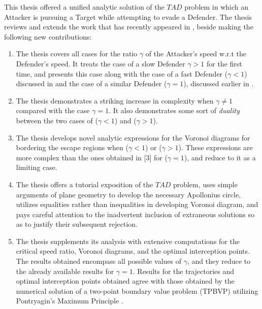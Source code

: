 This thesis offered a unified analytic solution of the $TAD$ problem in which an Attacker is pursuing a Target while attempting to evade a Defender. The thesis reviews and extends the work that has recently appeared in \cite{pachter2014active,garcia2015active,garcia2015escape}, beside making the following new contributions:

\begin{enumerate}
\item The thesis covers all cases for the ratio $\gamma$ of the Attacker's speed w.r.t the Defender's speed. It treats the case of a slow Defender $\gamma>1$ for the first time, and presents this case along with the case of a fast Defender ($\gamma<1$) discussed in \cite{garcia2015active} and the case of a similar Defender ($\gamma=1$), discussed earlier in \cite{pachter2014active,garcia2015escape}.
\item The thesis demonstrates a striking increase in complexity when $\gamma\neq1$ compared with the case $\gamma=1$. It also demonstrates some sort of \textit{duality} between the two cases of ($\gamma<1$) and ($\gamma>1$).
\item The thesis develops novel analytic expressions for the Voronoi diagrams for bordering the escape regions when ($\gamma<1$) or ($\gamma>1$). These expressions are more complex than the ones obtained in [3] for ($\gamma=1$), and reduce to it as a limiting case.
\item The thesis offers a tutorial exposition of the $TAD$ problem, uses simple arguments of plane geometry to develop the necessary Apollonius circle, utilizes equalities rather than inequalities in developing Voronoi diagram, and pays careful attention to the inadvertent inclusion of extraneous solutions so as to justify their subsequent rejection.
\item The thesis supplements its analysis with extensive computations for the critical speed ratio, Voronoi diagrams, and the optimal interception points. The results obtained encompass all possible values of $\gamma$, and they reduce to the already available results for $\gamma=1$. Results for the trajectories and optimal interception points obtained agree with those obtained by the numerical solution of a two-point boundary value problem (TPBVP) utilizing Pontryagin's Maximum Principle \cite{garcia2015active}.     
\end{enumerate}  

